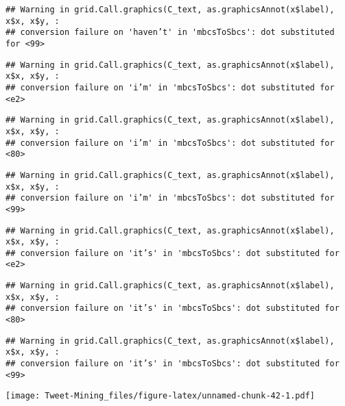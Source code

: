 \documentclass[
]{article}
\begin{document}
\begin{verbatim}
## Warning in grid.Call.graphics(C_text, as.graphicsAnnot(x$label), x$x, x$y, :
## conversion failure on 'haven’t' in 'mbcsToSbcs': dot substituted for <99>
\end{verbatim}

\begin{verbatim}
## Warning in grid.Call.graphics(C_text, as.graphicsAnnot(x$label), x$x, x$y, :
## conversion failure on 'i’m' in 'mbcsToSbcs': dot substituted for <e2>
\end{verbatim}

\begin{verbatim}
## Warning in grid.Call.graphics(C_text, as.graphicsAnnot(x$label), x$x, x$y, :
## conversion failure on 'i’m' in 'mbcsToSbcs': dot substituted for <80>
\end{verbatim}

\begin{verbatim}
## Warning in grid.Call.graphics(C_text, as.graphicsAnnot(x$label), x$x, x$y, :
## conversion failure on 'i’m' in 'mbcsToSbcs': dot substituted for <99>
\end{verbatim}

\begin{verbatim}
## Warning in grid.Call.graphics(C_text, as.graphicsAnnot(x$label), x$x, x$y, :
## conversion failure on 'it’s' in 'mbcsToSbcs': dot substituted for <e2>
\end{verbatim}

\begin{verbatim}
## Warning in grid.Call.graphics(C_text, as.graphicsAnnot(x$label), x$x, x$y, :
## conversion failure on 'it’s' in 'mbcsToSbcs': dot substituted for <80>
\end{verbatim}

\begin{verbatim}
## Warning in grid.Call.graphics(C_text, as.graphicsAnnot(x$label), x$x, x$y, :
## conversion failure on 'it’s' in 'mbcsToSbcs': dot substituted for <99>
\end{verbatim}

\texttt{[image: Tweet-Mining\_files/figure-latex/unnamed-chunk-42-1.pdf]}
\end{document}
